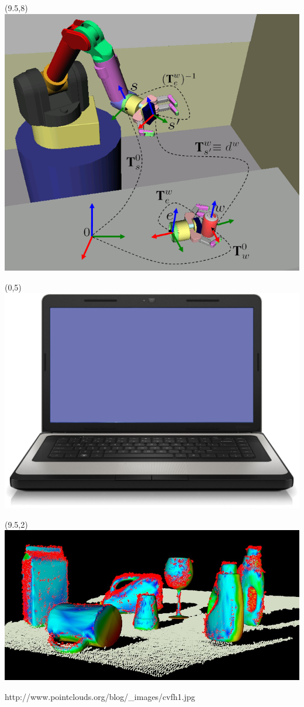 \documentclass{beamer}
\begin{document}
\begin{frame}[plain]{}
\begin{textblock}{5}
           \end{textblock} 
                \begin{textblock}{5}(9.5,8)
                    \includegraphics[width=1.2\linewidth]{figures/pick_and_place.png}
                 \end{textblock}           
           \begin{textblock}{5}(0,5)
               \includegraphics[width=0.6\linewidth]{figures/laptop.png}
           \end{textblock}                      
           \begin{textblock}{5}(9.5,2)
               \includegraphics[width=1.0\linewidth]{figures/object_recognition.jpg}
               
               \tiny{http://www.pointclouds.org/blog/\_images/cvfh1.jpg}
              \end{textblock}       
       \end{frame} 
       
\end{document}
